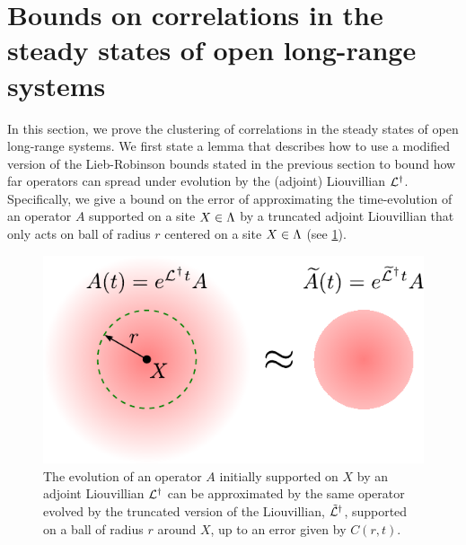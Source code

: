 \section{Bounds on correlations in the steady states of open long-range systems}
\label{sec:clustering-of-correlations}
In this section, we prove the clustering of correlations in the steady states of open long-range systems.
We first state a lemma that describes how to use a modified version of the Lieb-Robinson bounds stated in the previous section to bound how far operators can spread under evolution by the (adjoint) Liouvillian $\mathcal{L}^\dagger$.
Specifically, we give a bound on the error of approximating the time-evolution of an operator $A$ supported on a site $X\in\Lambda$ by a truncated adjoint Liouvillian that only acts on ball of radius $r$ centered on a site $X\in\Lambda$ (see \cref{fig:LRbound_truncated}).

\begin{figure}
\centering
  \includegraphics[scale=0.875]{figures/truncate.pdf}
  \caption{The evolution of an operator $A$ initially supported on $X$ by an adjoint Liouvillian $\mathcal{L}^\dag$ can be approximated by the same operator evolved by the truncated version of the Liouvillian, $\tilde {\mathcal{L}}^\dag$, supported on a ball of radius $r$ around $X$, up to an error given by $C(r,t)$.}
  \label{fig:LRbound_truncated}
\end{figure}

